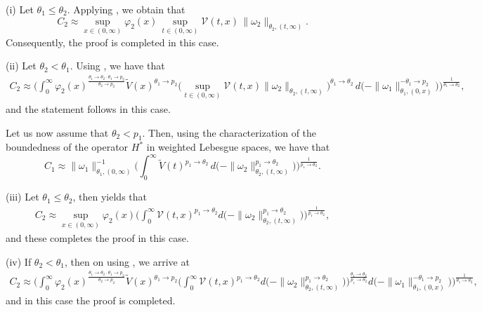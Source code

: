 \documentclass[11pt]{amsart}
\theoremstyle{plain}
\theoremstyle{definition}
\numberwithin{thm}{section}
\numberwithin{equation}{section}
\begin{document}
{\rm (i)} Let  ${\theta}_1\le {\theta}_2$. Applying \cite[Theorem 3.1, (i)]{gmp}, we obtain that
\begin{equation*}
C_2 {\approx} \sup_{x\in (0,\infty)} {\varphi}_2(x) \, \sup_{t\in (0,\infty)} {\mathcal V} (t,x) \,\|{\omega}_2\|_{{\theta}_2,(t,\infty)}.
\end{equation*}
Consequently, the proof is completed in this case.

{\rm (ii)} Let ${\theta}_2<{\theta}_1$. Using \cite[Theorem 3.1, (ii)]{gmp}, we have that
\begin{align*}
C_2 {\approx} \bigg( \int_0^{\infty} {\varphi}_2(x)^{\frac{{\theta}_1 {\rightarrow} {\theta}_2 \cdot {\theta}_1 {\rightarrow} p_2}{{\theta}_2 {\rightarrow} p_2}} \widetilde{V}(x)^{{\theta}_1 {\rightarrow} p_2}  \bigg(\sup_{t\in(0,\infty)}
{\mathcal V}(t,x) \|{\omega}_2\|_{{\theta}_2,(t,\infty)}\bigg)^{{\theta}_1 {\rightarrow} {\theta}_2}\, d\bigg( - \|{\omega}_1\|_{{\theta}_1,(0,x)}^{- {\theta}_1 {\rightarrow} p_2}\bigg) \bigg)^{\frac{1}{{\theta}_1 {\rightarrow} {\theta}_2}},
\end{align*}
and the statement follows in this case.

Let us now assume that ${\theta}_2 < p_1$. Then, using the characterization of the boundedness of the operator $H^*$ in weighted Lebesgue spaces, we have that
\begin{equation*}
C_1 {\approx} \|{\omega}_1\|_{{\theta}_1,(0,\infty)}^{-1} \bigg( \int_0^{\infty} \widetilde V(t)^{p_1 {\rightarrow} {\theta}_2} \,d\bigg( - \|{\omega}_2\|_{{\theta}_2, (t,\infty)}^{p_1 {\rightarrow} {\theta}_2}\bigg) \bigg)^{\frac{1}{p_1 {\rightarrow} {\theta}_2}}.
\end{equation*}

{\rm (iii)} Let ${\theta}_1\leq {\theta}_2$, then \cite[Theorem 3.1, (iii)]{gmp} yields that
\begin{align*}
C_2{\approx} \sup_{x\in (0,\infty)} {\varphi}_2(x) \bigg(\int_0^{\infty} {\mathcal V}(t,x)^{p_1 {\rightarrow} {\theta}_2} d \bigg( - \|{\omega}_2\|_{{\theta}_2, (t,\infty)}^{p_1 {\rightarrow}
	{\theta}_2}\bigg)\bigg)^{\frac{1}{p_1 {\rightarrow} {\theta}_2}},
\end{align*}
and these completes the proof in this case.

{\rm (iv)} If ${\theta}_2 < {\theta}_1$, then on using \cite[Theorem 3.1,
(iv)]{gmp}, we arrive at
\begin{align*}
C_2 {\approx}  \bigg( \int_0^\infty {\varphi}_2(x)^{\frac{{\theta}_1 {\rightarrow} {\theta}_2 \cdot {\theta}_1 {\rightarrow} p_2}{{\theta}_2 {\rightarrow} p_2}} \widetilde{V}(x)^{{\theta}_1 {\rightarrow} p_2} \bigg(\int_0^{\infty}{\mathcal V}(t,x)^{p_1 {\rightarrow} {\theta}_2} d \bigg(-\|{\omega}_2\|_{{\theta}_2,(t,\infty)}^{p_1 {\rightarrow} {\theta}_2} \bigg)
\bigg)^{\frac{{\theta}_1 {\rightarrow} {\theta}_2}{p_1 {\rightarrow} {\theta}_2}}
d\bigg(-\|{\omega}_1\|_{{\theta}_1,(0,x)}^{- {\theta}_1 {\rightarrow} p_2} \bigg)
\bigg)^{\frac{1}{{\theta}_1 {\rightarrow} {\theta}_2}},
\end{align*}
and in this case the proof is completed. 
\end{document}
